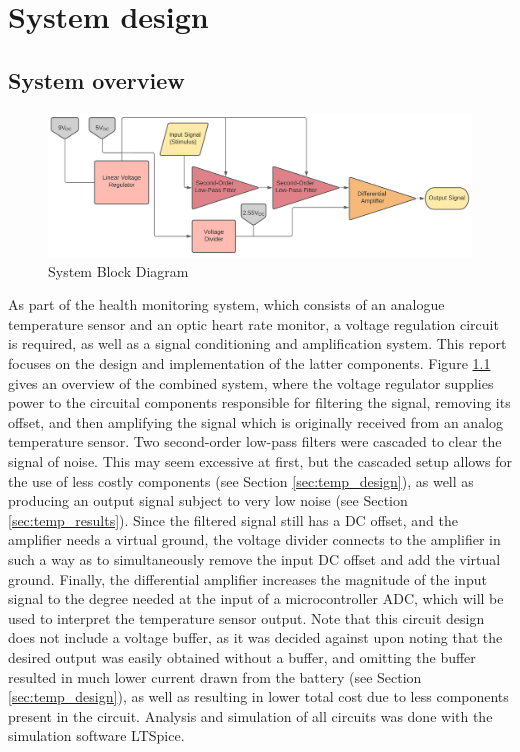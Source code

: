 
\chapter{System design}
	\section{System overview} \label{sec:system}

\begin{figure}[h]
    \centering
    \includegraphics[width = 1\textwidth]{Figures/1.1_block}
    \caption{System Block Diagram}
    \label{fig:1.1_block}
\end{figure}

As part of the health monitoring system, which consists of an analogue temperature sensor and an optic heart rate monitor, a voltage regulation circuit is required, as well as a signal conditioning and amplification system. This report focuses on the design and implementation of the latter components. Figure \ref{fig:1.1_block} gives an overview of the combined system, where the voltage regulator supplies power to the circuital components responsible for filtering the signal, removing its offset, and then amplifying the signal which is originally received from an analog temperature sensor. Two second-order low-pass filters were cascaded to clear the signal of noise. This may seem excessive at first, but the cascaded setup allows for the use of less costly components (see Section \ref{sec:temp_design}), as well as producing an output signal subject to very low noise (see Section \ref{sec:temp_results}). Since the filtered signal still has a DC offset, and the amplifier needs a virtual ground, the voltage divider connects to the amplifier in such a way as to simultaneously remove the input DC offset and add the virtual ground. Finally, the differential amplifier increases the magnitude of the input signal to the degree needed at the input of a microcontroller ADC, which will be used to interpret the temperature sensor output. Note that this circuit design does not include a voltage buffer, as it was decided against upon noting that the desired output was easily obtained without a buffer, and omitting the buffer resulted in much lower current drawn from the battery (see Section \ref{sec:temp_design}), as well as resulting in lower total cost due to less components present in the circuit. Analysis and simulation of all circuits was done with the simulation software LTSpice.

\vfill









